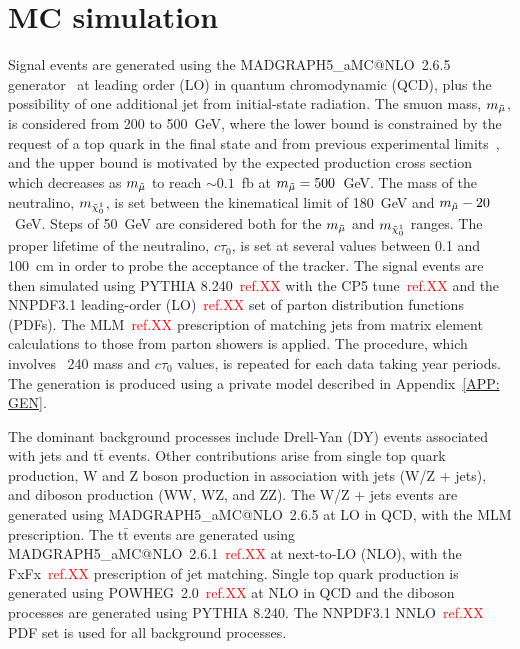 \documentclass{cernatlasnote}
\newcommand{\ttbar}{t$\bar{\text{t}}$\xspace}
\begin{document}
\section{MC simulation}
\label{SEC: MC}

Signal events are generated using the MADGRAPH5\_aMC@NLO~2.6.5 generator~\cite{MAD} at leading order (LO) in quantum chromodynamic (QCD), plus the possibility of one additional jet from initial-state radiation. The smuon mass, $m_{\Tilde{\mu}}$, is considered from 200 to 500~GeV, where the lower bound is constrained by the request of a top quark in the final state and from previous experimental limits~\cite{ATLAS1,ATLAS2,ATLAS3,CMS1,ATLAS4,CMS2,ATLAS5}, and the upper bound is motivated by the expected production cross section which decreases as $m_{\Tilde{\mu}}$ to reach $\sim 0.1$~fb at $m_{\Tilde{\mu}} = 500$~GeV. The mass of the neutralino, $m_{\Tilde{\chi}_{0}^{1}}$, is set between the kinematical limit of 180~GeV and $m_{\Tilde{\mu}} - 20$~GeV. Steps of 50~GeV are considered both for the $m_{\Tilde{\mu}}$ and $m_{\Tilde{\chi}_{0}^{1}}$ ranges. The proper lifetime of the neutralino, $c\tau_0$, is set at several values between 0.1 and 100~cm in order to probe the acceptance of the tracker. The signal events are then simulated using PYTHIA 8.240~\textcolor{red}{ref.XX} with the CP5 tune~\textcolor{red}{ref.XX} and the NNPDF3.1 leading-order (LO)~\textcolor{red}{ref.XX} set of parton distribution functions (PDFs). The MLM~\textcolor{red}{ref.XX} prescription of matching jets from matrix element calculations to those from parton showers is applied. The procedure, which involves ~240 mass and $c\tau_0$ values, is repeated for each data taking year periods.
\newline \smallskip
The generation is produced using a private model described in Appendix~\ref{APP: GEN}. 
\smallskip

The dominant background processes include Drell-Yan (DY) events associated with jets and \ttbar events. Other contributions arise from single top quark production, W and Z boson production in association with jets (W/Z + jets), and diboson production (WW, WZ, and ZZ). The W/Z + jets events are generated using MADGRAPH5\_aMC@NLO~2.6.5 at LO in QCD, with the MLM prescription. The \ttbar events are generated using MADGRAPH5\_aMC@NLO~2.6.1~\textcolor{red}{ref.XX} at next-to-LO (NLO), with the FxFx~\textcolor{red}{ref.XX} prescription of jet matching. Single top quark production is generated using POWHEG~2.0~\textcolor{red}{ref.XX} at NLO in QCD and the diboson processes are generated using PYTHIA 8.240. The NNPDF3.1 NNLO~\textcolor{red}{ref.XX} PDF set is used for all background processes.
\end{document}
